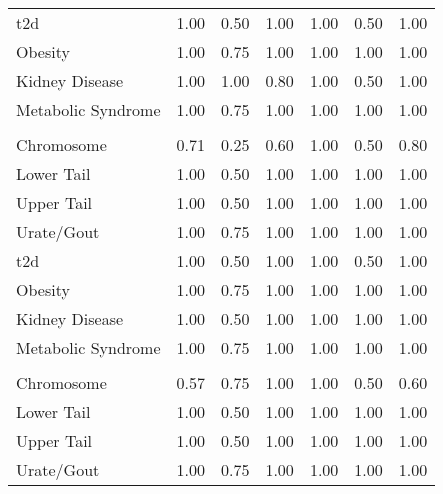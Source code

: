 \documentclass[twoside,openright]{report}
\begin{document}
\begin{table}
\begin{tabular}[t]{lllllll}
\hspace{1em}\Gls{t2d} & 1.00 & 0.50 & 1.00 & 1.00 & 0.50 & \vphantom{1} 1.00\\
\hspace{1em}Obesity & 1.00 & 0.75 & 1.00 & 1.00 & 1.00 & \vphantom{1} 1.00\\
\hspace{1em}Kidney Disease & 1.00 & 1.00 & 0.80 & 1.00 & 0.50 & 1.00\\
\hspace{1em}Metabolic Syndrome & 1.00 & 0.75 & 1.00 & 1.00 & 1.00 & \vphantom{2} 1.00\\
\addlinespace[0.3em]
\multicolumn{7}{l}{\textbf{Tajima's D}}\\
\hspace{1em}Chromosome & 0.71 & 0.25 & 0.60 & 1.00 & 0.50 & 0.80\\
\hspace{1em}Lower Tail & 1.00 & 0.50 & 1.00 & 1.00 & 1.00 & \vphantom{1} 1.00\\
\hspace{1em}Upper Tail & 1.00 & 0.50 & 1.00 & 1.00 & 1.00 & \vphantom{1} 1.00\\
\hspace{1em}Urate/Gout & 1.00 & 0.75 & 1.00 & 1.00 & 1.00 & \vphantom{1} 1.00\\
\hspace{1em}\Gls{t2d} & 1.00 & 0.50 & 1.00 & 1.00 & 0.50 & 1.00\\
\hspace{1em}Obesity & 1.00 & 0.75 & 1.00 & 1.00 & 1.00 & 1.00\\
\hspace{1em}Kidney Disease & 1.00 & 0.50 & 1.00 & 1.00 & 1.00 & 1.00\\
\hspace{1em}Metabolic Syndrome & 1.00 & 0.75 & 1.00 & 1.00 & 1.00 & \vphantom{1} 1.00\\
\addlinespace[0.3em]
\multicolumn{7}{l}{\textbf{Zeng's E}}\\
\hspace{1em}Chromosome & 0.57 & 0.75 & 1.00 & 1.00 & 0.50 & 0.60\\
\hspace{1em}Lower Tail & 1.00 & 0.50 & 1.00 & 1.00 & 1.00 & 1.00\\
\hspace{1em}Upper Tail & 1.00 & 0.50 & 1.00 & 1.00 & 1.00 & 1.00\\
\hspace{1em}Urate/Gout & 1.00 & 0.75 & 1.00 & 1.00 & 1.00 & 1.00\\

\end{tabular}
\end{table}
\end{document}
